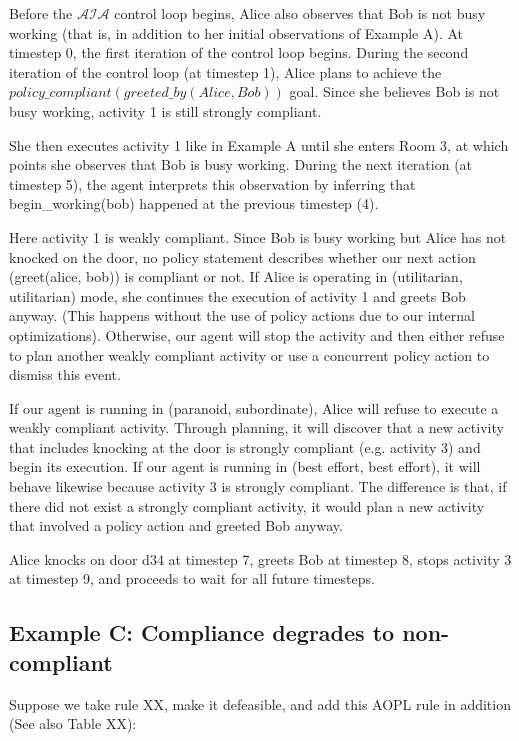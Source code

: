 Before the $\mathcal{AIA}$ control loop begins, Alice also observes that Bob is not busy working (that is, in addition to her initial observations of Example A).
At timestep 0, the first iteration of the control loop begins.
During the second iteration of the control loop (at timestep 1), Alice plans to achieve the $policy\_compliant(greeted\_by(Alice, Bob))$ goal.
Since she believes Bob is not busy working, activity 1 is still strongly compliant.

She then executes activity 1 like in Example A until she enters Room 3, at which points she observes that Bob is busy working.
During the next iteration (at timestep 5), the agent interprets this observation by inferring that begin\_working(bob) happened at the previous timestep (4).

Here activity 1 is weakly compliant.
Since Bob is busy working but Alice has not knocked on the door, no policy statement describes whether our next action (greet(alice, bob)) is compliant or not.
If Alice is operating in (utilitarian, utilitarian) mode, she continues the execution of activity 1 and greets Bob anyway.
(This happens without the use of policy actions due to our internal optimizations).
Otherwise, our agent will stop the activity and then either refuse to plan another weakly compliant activity or use a concurrent policy action to dismiss this event.

If our agent is running in (paranoid, subordinate), Alice will refuse to execute a weakly compliant activity.
Through planning, it will discover that a new activity that includes knocking at the door is strongly compliant (e.g. activity 3) and begin its execution.
If our agent is running in (best effort, best effort), it will behave likewise because activity 3 is strongly compliant.
The difference is that, if there did not exist a strongly compliant activity, it would plan a new activity that involved a policy action and greeted Bob anyway.


Alice knocks on door d34 at timestep 7, greets Bob at timestep 8, stops activity 3 at timestep 9, and proceeds to wait for all future timesteps.

\subsection{Example C: Compliance degrades to non-compliant}

Suppose we take rule XX, make it defeasible, and add this AOPL rule in addition (See also Table XX):

